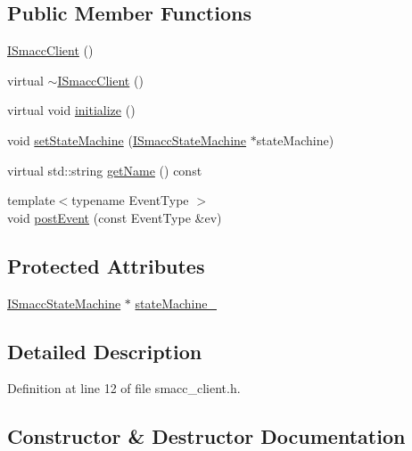 \subsection*{Public Member Functions}
\begin{DoxyCompactItemize}
\item 
\hyperlink{classsmacc_1_1ISmaccClient_a40222ad8b9b7962755434025b1fd5ae7}{I\+Smacc\+Client} ()
\item 
virtual \hyperlink{classsmacc_1_1ISmaccClient_a030e17771bf2e404a6fad97273c4d7f4}{$\sim$\+I\+Smacc\+Client} ()
\item 
virtual void \hyperlink{classsmacc_1_1ISmaccClient_a974ebb6ad6cf812e7b9de6b78b3d901f}{initialize} ()
\item 
void \hyperlink{classsmacc_1_1ISmaccClient_a28fd6ca2bcf9c5e57f3cc16fb0a076d3}{set\+State\+Machine} (\hyperlink{classsmacc_1_1ISmaccStateMachine}{I\+Smacc\+State\+Machine} $\ast$state\+Machine)
\item 
virtual std\+::string \hyperlink{classsmacc_1_1ISmaccClient_a20846aabfd1de832aa27d7a8237a1742}{get\+Name} () const 
\item 
{\footnotesize template$<$typename Event\+Type $>$ }\\void \hyperlink{classsmacc_1_1ISmaccClient_a46cbc0d695214efe40d29247323bfc80}{post\+Event} (const Event\+Type \&ev)
\end{DoxyCompactItemize}
\subsection*{Protected Attributes}
\begin{DoxyCompactItemize}
\item 
\hyperlink{classsmacc_1_1ISmaccStateMachine}{I\+Smacc\+State\+Machine} $\ast$ \hyperlink{classsmacc_1_1ISmaccClient_a926e4f2ae796def63d48dca389a48c47}{state\+Machine\+\_\+}
\end{DoxyCompactItemize}


\subsection{Detailed Description}


Definition at line 12 of file smacc\+\_\+client.\+h.



\subsection{Constructor \& Destructor Documentation}
